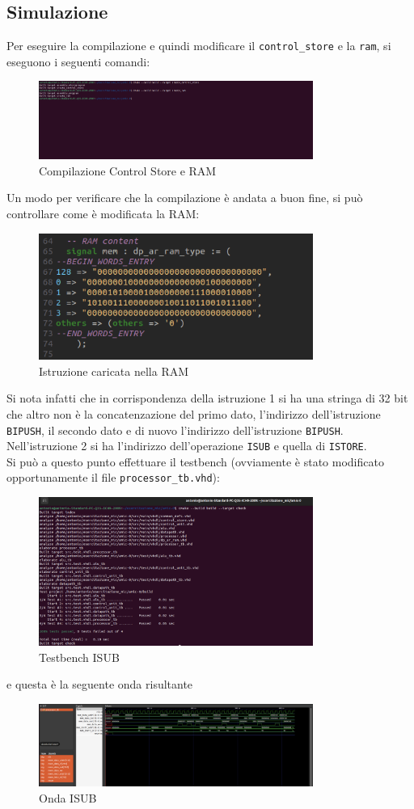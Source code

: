 \subsection{Simulazione}
Per eseguire la compilazione e quindi modificare il \texttt{control\_store} e la \texttt{ram}, si eseguono i seguenti comandi:
\begin{figure}[H]
	\centering
	\includegraphics[width=0.8\textwidth]{img/Esercizio_9/Compile}
	\caption{Compilazione Control Store e RAM}
	\label{compile}
\end{figure}
Un modo per verificare che la compilazione è andata a buon fine, si può controllare come è modificata la RAM:
\begin{figure}[H]
	\centering
	\includegraphics[width=0.8\textwidth]{img/Esercizio_9/ram_sub}
	\caption{Istruzione caricata nella RAM}
	\label{tam_sub}
\end{figure}
Si nota infatti che in corrispondenza della istruzione 1 si ha una stringa di 32 bit che altro non è la concatenzazione del primo dato, l'indirizzo dell'istruzione \texttt{BIPUSH}, il secondo dato e di nuovo l'indirizzo dell'istruzione \texttt{BIPUSH}. 
Nell'istruzione 2 si ha l'indirizzo dell'operazione \texttt{ISUB} e quella di \texttt{ISTORE}.\\
Si può a questo punto effettuare il testbench (ovviamente è stato modificato opportunamente il file \texttt{processor\_tb.vhd}):
\begin{figure}[H]
	\centering
	\includegraphics[width=0.8\textwidth]{img/Esercizio_9/tb_sub}
	\caption{Testbench ISUB}
	\label{tb_sub}
\end{figure}
e questa è la seguente onda risultante
\begin{figure}[H]
	\centering
	\includegraphics[width=0.8\textwidth]{img/Esercizio_9/sub_wave}
	\caption{Onda ISUB}
	\label{sub_wave}
\end{figure}
